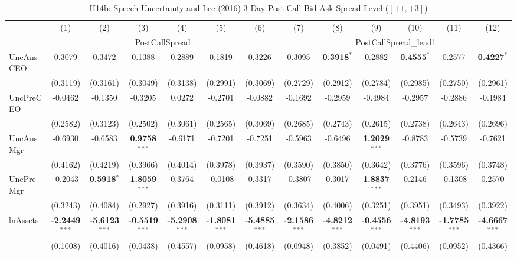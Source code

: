 \begin{landscape}
\begin{table}[H]
\setlength{\tabcolsep}{3pt}
\renewcommand{\arraystretch}{0.85}
\centering
\caption{H14b: Speech Uncertainty and Lee (2016) 3-Day Post-Call Bid-Ask Spread Level ($[+1,+3]$)}
\label{tab:h14b}
\scriptsize
\begin{tabular}{lcccccccccccc}
\toprule
 & (1) & (2) & (3) & (4) & (5) & (6) & (7) & (8) & (9) & (10) & (11) & (12) \\
 & \multicolumn{6}{c}{PostCallSpread} & \multicolumn{6}{c}{PostCallSpread\_lead1} \\
\cmidrule(lr){2-7} \cmidrule(lr){8-13}
\midrule
UncAnsCEO & 0.3079 & 0.3472 & 0.1388 & 0.2889 & 0.1819 & 0.3226 & 0.3095 & \textbf{0.3918}$^{*}$ & 0.2882 & \textbf{0.4555}$^{*}$ & 0.2577 & \textbf{0.4227}$^{*}$ \\
 & (0.3119) & (0.3161) & (0.3049) & (0.3138) & (0.2991) & (0.3069) & (0.2729) & (0.2912) & (0.2784) & (0.2985) & (0.2750) & (0.2961) \\
UncPreCEO & -0.0462 & -0.1350 & -0.3205 & 0.0272 & -0.2701 & -0.0882 & -0.1692 & -0.2959 & -0.4984 & -0.2957 & -0.2886 & -0.1984 \\
 & (0.2582) & (0.3123) & (0.2502) & (0.3061) & (0.2565) & (0.3069) & (0.2685) & (0.2743) & (0.2615) & (0.2738) & (0.2643) & (0.2696) \\
UncAnsMgr & -0.6930 & -0.6583 & \textbf{0.9758}$^{***}$ & -0.6171 & -0.7201 & -0.7251 & -0.5963 & -0.6496 & \textbf{1.2029}$^{***}$ & -0.8783 & -0.5739 & -0.7621 \\
 & (0.4162) & (0.4219) & (0.3966) & (0.4014) & (0.3978) & (0.3937) & (0.3590) & (0.3850) & (0.3642) & (0.3776) & (0.3596) & (0.3748) \\
UncPreMgr & -0.2043 & \textbf{0.5918}$^{*}$ & \textbf{1.8059}$^{***}$ & 0.3764 & -0.0108 & 0.3317 & -0.3807 & 0.3017 & \textbf{1.8837}$^{***}$ & 0.2146 & -0.1308 & 0.2570 \\
 & (0.3243) & (0.4084) & (0.2927) & (0.3916) & (0.3111) & (0.3912) & (0.3634) & (0.4006) & (0.3251) & (0.3951) & (0.3493) & (0.3922) \\
\midrule
lnAssets & \textbf{-2.2449}$^{***}$ & \textbf{-5.6123}$^{***}$ & \textbf{-0.5519}$^{***}$ & \textbf{-5.2908}$^{***}$ & \textbf{-1.8081}$^{***}$ & \textbf{-5.4885}$^{***}$ & \textbf{-2.1586}$^{***}$ & \textbf{-4.8212}$^{***}$ & \textbf{-0.4556}$^{***}$ & \textbf{-4.8193}$^{***}$ & \textbf{-1.7785}$^{***}$ & \textbf{-4.6667}$^{***}$ \\
 & (0.1008) & (0.4016) & (0.0438) & (0.4557) & (0.0958) & (0.4618) & (0.0948) & (0.3852) & (0.0491) & (0.4406) & (0.0952) & (0.4366) \\

\end{tabular}
\end{table}
\end{landscape}
